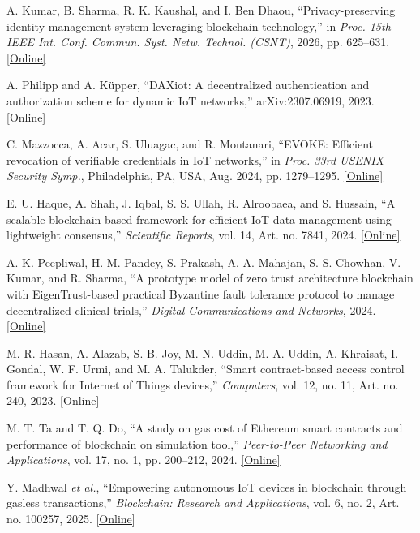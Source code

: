 A. Kumar, B. Sharma, R. K. Kaushal, and I. Ben Dhaou, ``Privacy-preserving identity management system leveraging blockchain technology,'' in \emph{Proc. 15th IEEE Int. Conf. Commun. Syst. Netw. Technol. (CSNT)}, 2026, pp. 625--631. \href{https://doi.org/10.1109/CSNT69054.2026.11502058}{[Online]}

A. Philipp and A. K\"upper, ``DAXiot: A decentralized authentication and authorization scheme for dynamic IoT networks,'' arXiv:2307.06919, 2023. \href{https://doi.org/10.48550/arXiv.2307.06919}{[Online]}

C. Mazzocca, A. Acar, S. Uluagac, and R. Montanari, ``EVOKE: Efficient revocation of verifiable credentials in IoT networks,'' in \emph{Proc. 33rd USENIX Security Symp.}, Philadelphia, PA, USA, Aug. 2024, pp. 1279--1295. \href{https://www.usenix.org/system/files/usenixsecurity24-mazzocca.pdf}{[Online]}

E. U. Haque, A. Shah, J. Iqbal, S. S. Ullah, R. Alroobaea, and S. Hussain, ``A scalable blockchain based framework for efficient IoT data management using lightweight consensus,'' \emph{Scientific Reports}, vol. 14, Art. no. 7841, 2024. \href{https://doi.org/10.1038/s41598-024-58578-7}{[Online]}

A. K. Peepliwal, H. M. Pandey, S. Prakash, A. A. Mahajan, S. S. Chowhan, V. Kumar, and R. Sharma, ``A prototype model of zero trust architecture blockchain with EigenTrust-based practical Byzantine fault tolerance protocol to manage decentralized clinical trials,'' \emph{Digital Communications and Networks}, 2024. \href{https://www.sciencedirect.com/science/article/pii/S2096720924000459}{[Online]}

M. R. Hasan, A. Alazab, S. B. Joy, M. N. Uddin, M. A. Uddin, A. Khraisat, I. Gondal, W. F. Urmi, and M. A. Talukder, ``Smart contract-based access control framework for Internet of Things devices,'' \emph{Computers}, vol. 12, no. 11, Art. no. 240, 2023. \href{https://doi.org/10.3390/computers12110240}{[Online]}

M. T. Ta and T. Q. Do, ``A study on gas cost of Ethereum smart contracts and performance of blockchain on simulation tool,'' \emph{Peer-to-Peer Networking and Applications}, vol. 17, no. 1, pp. 200--212, 2024. \href{https://doi.org/10.1007/s12083-023-01598-3}{[Online]}

Y. Madhwal \emph{et al.}, ``Empowering autonomous IoT devices in blockchain through gasless transactions,'' \emph{Blockchain: Research and Applications}, vol. 6, no. 2, Art. no. 100257, 2025. \href{https://doi.org/10.1016/j.bcra.2024.100257}{[Online]}


